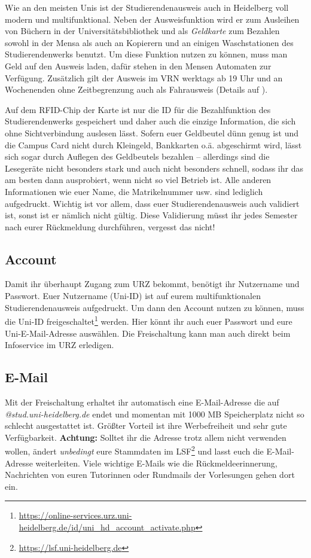 Wie an den meisten Unis ist der Studierendenausweis auch in Heidelberg voll modern und multifunktional. Neben der Ausweisfunktion wird er zum Ausleihen von Büchern in der Universitätsbibliothek und als \emph{Geldkarte} zum Bezahlen sowohl in der Mensa als auch an Kopierern und an einigen Waschstationen des Studierendenwerks benutzt. Um diese Funktion nutzen zu können, muss man Geld auf den Ausweis laden, dafür stehen in den Mensen Automaten zur Verfügung. Zusätzlich gilt der Ausweis im \gls{VRN} werktags ab 19 Uhr und an Wochenenden ohne Zeitbegrenzung auch als Fahrausweis (Details auf ).

Auf dem RFID-Chip der Karte ist nur die ID für die Bezahlfunktion des Studierendenwerks gespeichert und daher auch die einzige Information, die sich ohne Sichtverbindung auslesen lässt. Sofern euer Geldbeutel dünn genug ist und die Campus Card nicht durch Kleingeld, Bankkarten o.ä. abgeschirmt wird, lässt sich sogar durch Auflegen des Geldbeutels bezahlen -- allerdings sind die Lesegeräte nicht besonders stark und auch nicht besonders schnell, sodass ihr das am besten dann ausprobiert, wenn nicht so viel Betrieb ist. Alle anderen Informationen wie euer Name, die Matrikelnummer usw. sind lediglich aufgedruckt. Wichtig ist vor allem, dass euer Studierendenausweis auch validiert ist, sonst ist er nämlich nicht gültig. Diese Validierung müsst ihr jedes Semester nach eurer Rückmeldung durchführen, vergesst das nicht!

\subsection{Account}
Damit ihr überhaupt Zugang zum URZ bekommt, benötigt ihr Nutzername und Passwort. Euer Nutzername (Uni-ID) ist auf eurem multifunktionalen Studierendenausweis aufgedruckt. Um dann den Account nutzen zu können, muss die Uni-ID freigeschaltet\footnote{\url{https://online-services.urz.uni-heidelberg.de/id/uni_hd_account_activate.php}} werden. Hier könnt ihr auch euer Passwort und eure Uni-E-Mail-Adresse auswählen. Die Freischaltung kann man auch direkt beim Infoservice im URZ erledigen.

\vspace*{-2mm}
\subsection{E-Mail}
\vspace*{-1mm}
Mit der Freischaltung erhaltet ihr automatisch eine E-Mail-Adresse die auf \emph{@stud.uni-heidelberg.de} endet und momentan mit 1000 MB Speicherplatz nicht so schlecht ausgestattet ist. Größter Vorteil ist ihre Werbefreiheit und sehr gute Verfügbarkeit. \textbf{Achtung:} Solltet ihr die Adresse trotz allem nicht verwenden wollen, ändert \emph{unbedingt} eure Stammdaten im LSF\footnote{\url{https://lsf.uni-heidelberg.de}} und lasst euch die E-Mail-Adresse weiterleiten. Viele wichtige E-Mails wie die Rückmeldeerinnerung, Nachrichten von euren Tutorinnen oder Rundmails der Vorlesungen gehen dort ein.

